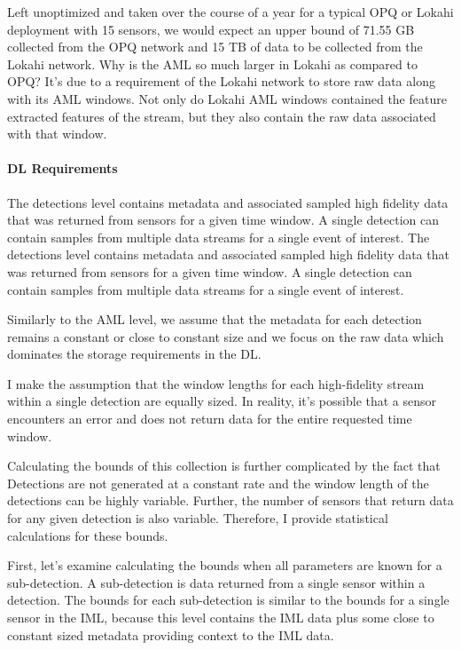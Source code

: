Left unoptimized and taken over the course of a year for a typical OPQ or Lokahi deployment with 15 sensors, we would expect an upper bound of 71.55 GB collected from the OPQ network and 15 TB of data to be collected from the Lokahi network. Why is the AML so much larger in Lokahi as compared to OPQ? It's due to a requirement of the Lokahi network to store raw data along with its AML windows. Not only do Lokahi AML windows contained the feature extracted features of the stream, but they also contain the raw data associated with that window.

\paragraph{DL Requirements}
The detections level contains metadata and associated sampled high fidelity data that was returned from sensors for a given time window. A single detection can contain samples from multiple data streams for a single event of interest.
The detections level contains metadata and associated sampled high fidelity data that was returned from sensors for a given time window. A single detection can contain samples from multiple data streams for a single event of interest.

Similarly to the AML level, we assume that the metadata for each detection remains a constant or close to constant size and we focus on the raw data which dominates the storage requirements in the DL\@.

I make the assumption that the window lengths for each high-fidelity stream within a single detection are equally sized. In reality, it's possible that a sensor encounters an error and does not return data for the entire requested time window.

Calculating the bounds of this collection is further complicated by the fact that Detections are not generated at a constant rate and the window length of the detections can be highly variable. Further, the number of sensors that return data for any given detection is also variable. Therefore, I provide statistical calculations for these bounds.

First, let's examine calculating the bounds when all parameters are known for a sub-detection. A sub-detection is data returned from a single sensor within a detection. The bounds for each sub-detection is similar to the bounds for a single sensor in the IML, because this level contains the IML data plus some close to constant sized metadata providing context to the IML data.

